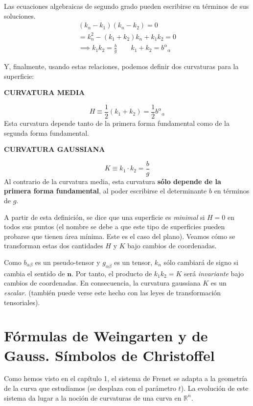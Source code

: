 Las ecuaciones algebraicas de segundo grado pueden escribirse en términos de sus soluciones.
\begin{gather*}
    (k_n-k_1)(k_n-k_2)=0\\
    =k_n^2-(k_1+k_2)k_n+k_1k_2=0\\
    \implies k_1k_2=\frac{b}{g} \qquad k_1+k_2=b^\alpha {}_\alpha 
\end{gather*}

Y, finalmente, usando estas relaciones, podemos definir dos curvaturas para la superficie:
\begin{mybox}
    \begin{center}
        \textbf{CURVATURA MEDIA}
    \end{center}
    $$
    H\equiv \frac{1}{2}(k_1+k_2)=\frac{1}{2}b^\alpha {}_\alpha 
    $$
    Esta curvatura depende tanto de la primera forma fundamental como de la segunda forma fundamental.
    \begin{center}
        \textbf{CURVATURA GAUSSIANA}
    \end{center}
    $$
    K\equiv k_1\cdot k_2=\frac{b}{g}
    $$
    Al contrario de la curvatura media, esta curvatura \textbf{sólo depende de la primera forma fundamental}, al poder escribirse el determinante $b$ en términos de $g$.
\end{mybox}

A partir de esta definición, se dice que una superficie es \emph{minimal} si $H=0$ en todos sus puntos (el nombre se debe a que este tipo de superficies pueden probarse que tienen área mínima. Este es el caso del plano). Veamos cómo se transforman estas dos cantidades $H$ y $K$ bajo cambios de coordenadas. 

Como $b_{\alpha \beta }$ es un pseudo-tensor y $g_{\alpha \beta }$ es un tensor, $k_n$ sólo cambiará de signo si cambia el sentido de $\mathbf{n}$. Por tanto, el producto de $k_1k_2=K$ será \emph{invariante} bajo cambios de coordenadas. En consecuencia, la curvatura gaussiana $K$ es un \emph{escalar}. (también puede verse este hecho con las leyes de transformación tensoriales).
\section{Fórmulas de Weingarten y de Gauss. Símbolos de Christoffel}
Como hemos visto en el capítulo 1, el sistema de Frenet se adapta a la geometría de la curva que estudiamos (se desplaza con el parámetro $t$). La evolución de este sistema da lugar a la noción de curvaturas de una curva en $\mathbb{R}^n$. \\

